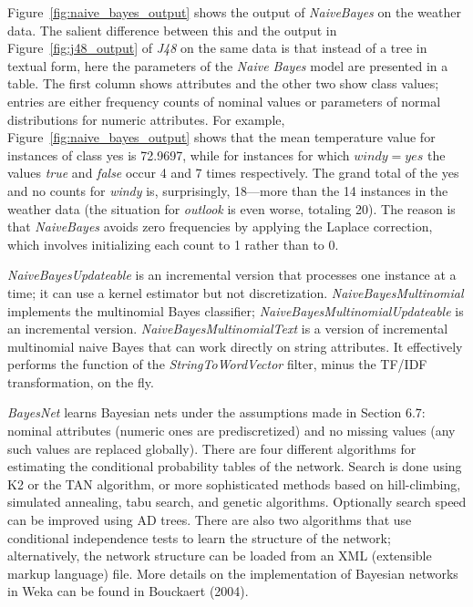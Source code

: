 Figure~\ref{fig:naive_bayes_output} shows the output of
\textit{NaiveBayes} on the weather data. The salient difference
between this and the output in Figure~\ref{fig:j48_output} of
\textit{J48} on the same data is that instead of a tree in textual
form, here the parameters of the \textit{Naive Bayes} model are
presented in a table. The first column shows attributes and the other
two show class values; entries are either frequency counts of nominal
values or parameters of normal distributions for numeric
attributes. For example, Figure~\ref{fig:naive_bayes_output} shows
that the mean temperature value for instances of class yes is 72.9697,
while for instances for which $windy = yes$ the values \textit{true}
and \textit{false} occur 4 and 7 times respectively. The grand total
of the yes and no counts for \textit{windy} is, surprisingly,
18---more than the 14 instances in the weather data (the situation for
\textit{outlook} is even worse, totaling 20). The reason is that
\textit{NaiveBayes} avoids zero frequencies by applying the Laplace
correction, which involves initializing each count to 1 rather than to
0.

\textit{NaiveBayesUpdateable} is an incremental version that processes
one instance at a time; it can use a kernel estimator but not
discretization. \textit{NaiveBayesMultinomial} implements the
multinomial Bayes classifier; \textit{NaiveBayesMultinomialUpdateable}
is an incremental version. \textit{NaiveBayesMultinomialText} is a
version of incremental multinomial naive Bayes that can work directly
on string attributes. It effectively performs the function of the
\textit{StringToWordVector} filter, minus the TF/IDF transformation,
on the fly.

\textit{BayesNet} learns Bayesian nets under the assumptions made in
Section 6.7: nominal attributes (numeric ones are prediscretized) and
no missing values (any such values are replaced globally). There are
four different algorithms for estimating the conditional probability
tables of the network. Search is done using K2 or the TAN algorithm,
or more sophisticated methods based on hill-climbing, simulated
annealing, tabu search, and genetic algorithms. Optionally search
speed can be improved using AD trees. There are also two algorithms
that use conditional independence tests to learn the structure of the
network; alternatively, the network structure can be loaded from an
XML (extensible markup language) file. More details on the
implementation of Bayesian networks in Weka can be found in Bouckaert
(2004).

